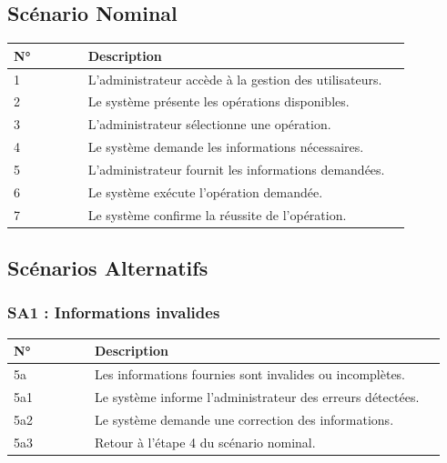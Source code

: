 \hypertarget{scuxe9nario-nominal-5}{%
\subsection{Scénario Nominal}\label{scuxe9nario-nominal-5}}

\begin{longtable}{@{}p{0.18\linewidth}p{0.78\linewidth}@{}}
\toprule
\rowcolors{2}{gray!10}{white}
\textbf{N°} & \textbf{Description} \\
\midrule
\endhead
1 & L'administrateur accède à la gestion des utilisateurs. \\
2 & Le système présente les opérations disponibles. \\
3 & L'administrateur sélectionne une opération. \\
4 & Le système demande les informations nécessaires. \\
5 & L'administrateur fournit les informations demandées. \\
6 & Le système exécute l'opération demandée. \\
7 & Le système confirme la réussite de l'opération. \\
\bottomrule
\end{longtable}

\hypertarget{scuxe9narios-alternatifs-5}{%
\subsection{Scénarios Alternatifs}\label{scuxe9narios-alternatifs-5}}

\hypertarget{sa1-informations-invalides}{%
\subsubsection{SA1 : Informations
invalides}\label{sa1-informations-invalides}}

\begin{longtable}{@{}p{0.18\linewidth}p{0.78\linewidth}@{}}
\toprule
\rowcolors{2}{gray!10}{white}
\textbf{N°} & \textbf{Description} \\
\midrule
\endhead
5a & Les informations fournies sont invalides ou incomplètes. \\
5a1 & Le système informe l'administrateur des erreurs détectées. \\
5a2 & Le système demande une correction des informations. \\
5a3 & Retour à l'étape 4 du scénario nominal. \\
\bottomrule
\end{longtable}

